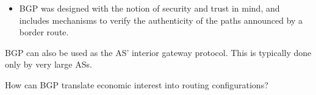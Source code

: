 \begin{itemize}
\begin{itemize}
\item BGP was designed with the notion of security and trust in mind, and includes mechanisms
to verify the authenticity of the paths announced by a border route.
\end{itemize}
\end{itemize}

\begin{remark}
BGP can also be used as the AS' interior gateway protocol. 
This is typically done only by very large ASs.
\end{remark}

\begin{exercise}
How can BGP translate economic interest into routing configurations?
\end{exercise}
